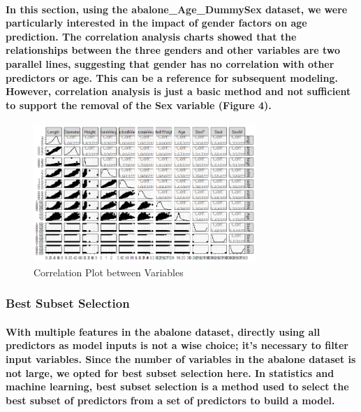 \documentclass[11pt]{article} %
\begin{document}
\paragraph{In this section, using the abalone\_Age\_DummySex dataset, we were particularly interested in the impact of gender factors on age prediction. The correlation analysis charts showed that the relationships between the three genders and other variables are two parallel lines, suggesting that gender has no correlation with other predictors or age. This can be a reference for subsequent modeling. However, correlation analysis is just a basic method and not sufficient to support the removal of the Sex variable (Figure 4).}
% 
% 
\begin{figure}[H]
    \centering
    \includegraphics[width=0.75\textwidth]{Pic/ggpairs.png}
    \caption{Correlation Plot between Variables}
\end{figure}
% 
% 
% 
\subsubsection{Best Subset Selection}
\paragraph{With multiple features in the abalone dataset, directly using all predictors as model inputs is not a wise choice; it's necessary to filter input variables. Since the number of variables in the abalone dataset is not large, we opted for best subset selection here. In statistics and machine learning, best subset selection is a method used to select the best subset of predictors from a set of predictors to build a model.}
\end{document}

